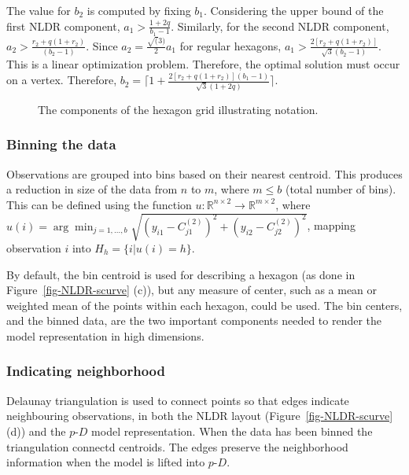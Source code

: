 \documentclass[
  12pt]{article}
\newcommand\pD{$p\text{-}D$}
\begin{document}
The value for \(b_2\) is computed by fixing \(b_1\). Considering the
upper bound of the first NLDR component, \(a_1 > \frac{1+2q}{b_1 -1}\).
Similarly, for the second NLDR component,
\(a_2 > \frac{r_2 + q(1 + r_2)}{(b_2 - 1)}\). Since
\(a_2 = \frac{\sqrt(3)}{2}a_1\) for regular hexagons,
\(a_1 > \frac{2[r_2 + q(1 + r_2)]}{\sqrt{3}(b_2 - 1)}\). This is a
linear optimization problem. Therefore, the optimal solution must occur
on a vertex. Therefore,
\(b_2 = \Big\lceil1 +\frac{2[r_2 + q(1 + r_2)](b_1 - 1)}{\sqrt{3}(1 + 2q)}\Big\rceil\).

\begin{figure}[H]


\caption{\label{fig-hex-param}The components of the hexagon grid
illustrating notation.}

\end{figure}%

\subsubsection{Binning the data}\label{binning-the-data}

Observations are grouped into bins based on their nearest centroid. This
produces a reduction in size of the data from \(n\) to \(m\), where
\(m\leq b\) (total number of bins). This can be defined using the
function
\(u: \mathbb{R}^{n\times 2} \rightarrow \mathbb{R}^{m\times 2}\), where
\(u(i) = \arg\min_{j = 1, \dots, b} \sqrt{(y_{i1} - C^{(2)}_{j1})^2 + (y_{i2} - C^{(2)}_{j2})^2}\),
mapping observation \(i\) into \(H_h = \{i| u(i) = h\}\).

By default, the bin centroid is used for describing a hexagon (as done
in Figure~\ref{fig-NLDR-scurve} (c)), but any measure of center, such as
a mean or weighted mean of the points within each hexagon, could be
used. The bin centers, and the binned data, are the two important
components needed to render the model representation in high dimensions.

\subsubsection{Indicating neighborhood}\label{indicating-neighborhood}

Delaunay triangulation \citep{lee1980, alb2024} is used to connect
points so that edges indicate neighbouring observations, in both the
NLDR layout (Figure~\ref{fig-NLDR-scurve} (d)) and the \pD{} model
representation. When the data has been binned the triangulation connectd
centroids. The edges preserve the neighborhood information when the
model is lifted into \pD{}.
\end{document}
